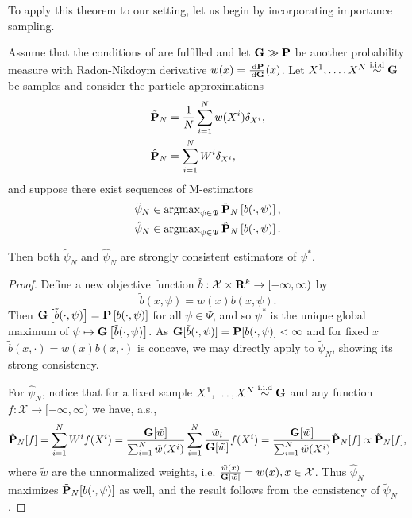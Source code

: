 To apply this theorem to our setting, let us begin by incorporating importance sampling. 

\begin{lemma}
    \label{lem:is-consistency}
    Assume that the conditions of  are fulfilled and let $\G \gg \P$ be another probability measure with Radon-Nikdoym derivative $w(x) = \rnd{\P}{\G}(x)$. Let $X^{1}, \dots, X^{N} \iid \G$ be samples and consider the particle approximations 
    \begin{align*}
        \tilde \P_{N} &= \frac{1}{N}\sum_{i = 1}^N w(X^{i})\delta_{X^{i}},  \\ 
        \hat \P_{N} &= \sum_{i = 1}^{N} W^{i} \delta_{X^{i}},
    \end{align*}
    and suppose there exist sequences of M-estimators 
    \begin{align*}
    \tilde \psi_{N} &\in \argmax_{\psi \in \Psi} \tilde \P _{N} \left[ b(\cdot, \psi) \right],\\
    \hat \psi_{N} &\in \argmax_{\psi \in \Psi} \hat \P _{N} \left[ b(\cdot, \psi) \right].
    \end{align*}

    Then both $\tilde\psi_{N}$ and $\hat\psi_{N}$ are strongly consistent estimators of $\psi^{\ast}$.
\end{lemma}
\begin{proof}
    Define a new objective function $\tilde b : \mathcal X \times \R^{k} \to [-\infty, \infty)$ by 
    $$
    \tilde b(x, \psi) = w(x) b(x, \psi).
    $$
    Then $\G \left[ \tilde b(\cdot, \psi) \right] = \P \left[ b(\cdot, \psi) \right]$ for all $\psi\in\Psi$, and so $\psi^{\ast}$ is the unique global maximum of $\psi \mapsto \G \left[ \tilde b(\cdot, \psi) \right]$. 
    As $\G [\tilde b(\cdot, \psi)] = \P [b(\cdot, \psi)] < \infty$ and for fixed $x$ $\tilde b(x, \cdot) = w(x)b(x,\cdot)$ is concave, we may directly apply  to $\tilde\psi_{N}$, showing its strong consistency.

    For $\hat\psi_{N}$, notice that for a fixed sample $X^{1}, \dots, X^{N} \iid \G$ and any function $f: \mathcal X \to [-\infty, \infty)$ we have, a.s., 
    $$
        \hat \P _{N} [f] = \sum_{i = 1}^{N} W^{i} f(X^{i}) = \frac{\G [\tilde w]}{\sum_{i = 1}^N \tilde w(X^{i})} \sum_{i = 1}^{N} \frac{\tilde w_{i}}{\G[\tilde w]} f(X^{i}) = \frac{\G [\tilde w]}{\sum_{i = 1}^{N} \tilde w(X^{i})} \tilde \P _{N} [f] \propto \tilde \P_{N} [f],
    $$
    where $\tilde w$ are the unnormalized weights, i.e. $ \frac{\tilde w(x)}{\G [\tilde w]} = w(x), x \in\mathcal X$.
    Thus $\hat \psi_{N}$ maximizes $\tilde \P_{N} [b(\cdot, \psi)]$ as well, and the result follows from the consistency of $\tilde \psi_{N}$.
\end{proof}

